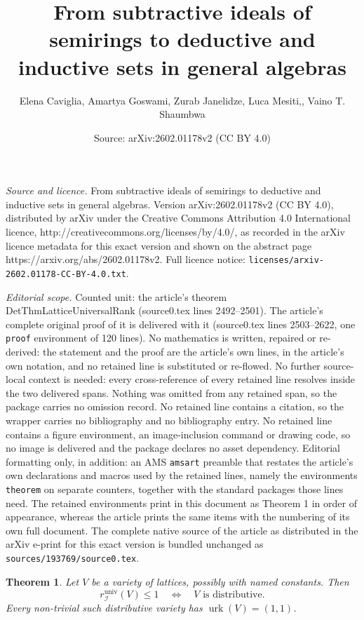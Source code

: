 \documentclass[10pt,a4paper]{amsart}
\title{From subtractive ideals of semirings to deductive and inductive sets in general algebras}
\author{Elena Caviglia, Amartya Goswami, Zurab Janelidze, Luca Mesiti,, Vaino T. Shaumbwa}
\date{Source: arXiv:2602.01178v2 (CC BY 4.0)}
\newtheorem{theorem}{Theorem}
\begin{document}
\maketitle

\noindent\emph{Source and licence.} From subtractive ideals of semirings to deductive and inductive sets in general algebras. Version arXiv:2602.01178v2 (CC BY 4.0), distributed by arXiv under the Creative Commons Attribution 4.0 International licence, http://creativecommons.org/licenses/by/4.0/, as recorded in the arXiv licence metadata for this exact version and shown on the abstract page https://arxiv.org/abs/2602.01178v2. Full licence notice: \texttt{licenses/arxiv-2602.01178-CC-BY-4.0.txt}.\par\smallskip

\noindent\textit{Editorial scope.} Counted unit: the article's theorem DetThmLatticeUniversalRank (source0.tex lines 2492--2501). The article's complete original proof of it is delivered with it (source0.tex lines 2503--2622, one \texttt{proof} environment of 120 lines). No mathematics is written, repaired or re-derived: the statement and the proof are the article's own lines, in the article's own notation, and no retained line is substituted or re-flowed.  No further source-local context is needed: every cross-reference of every retained line resolves inside the two delivered spans.  Nothing was omitted from any retained span, so the package carries no omission record.  No retained line contains a citation, so the wrapper carries no bibliography and no bibliography entry.  No retained line contains a figure environment, an image-inclusion command or drawing code, so no image is delivered and the package declares no asset dependency.  Editorial formatting only, in addition: an AMS \texttt{amsart} preamble that restates the article's own declarations and macros used by the retained lines, namely the environments \texttt{theorem} on separate counters, together with the standard packages those lines need.  The retained environments print in this document as Theorem 1 in order of appearance, whereas the article prints the same items with the numbering of its own full document.  The complete native source of the article as distributed in the arXiv e-print for this exact version is bundled unchanged as \texttt{sources/193769/source0.tex}.
\begin{theorem}\label{DetThmLatticeUniversalRank}
Let $V$ be a variety of lattices, possibly with named constants. Then
\[
r_{\mathcal I}^{\mathrm{univ}}(V)\leqslant1
\quad\Longleftrightarrow\quad
V\text{ is distributive}.
\]
Every non-trivial such distributive variety has
$\operatorname{urk}(V)=(1,1)$.
\end{theorem}
\end{document}
